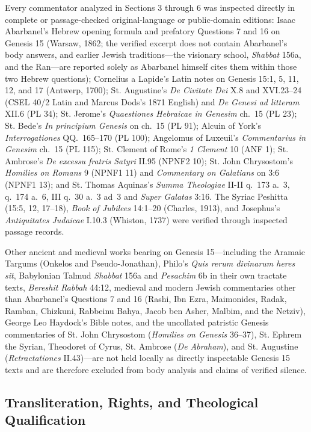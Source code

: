 Every commentator analyzed in Sections 3 through 6 was inspected directly in complete or passage-checked original-language or public-domain editions: Isaac Abarbanel's Hebrew opening formula and prefatory Questions 7 and 16 on Genesis 15 (Warsaw, 1862; the verified excerpt does not contain Abarbanel's body answers, and earlier Jewish traditions---the visionary school, \emph{Shabbat} 156a, and the Ran---are reported solely as Abarbanel himself cites them within those two Hebrew questions); Cornelius a Lapide's Latin notes on Genesis 15:1, 5, 11, 12, and 17 (Antwerp, 1700); St. Augustine's \emph{De Civitate Dei} X.8 and XVI.23--24 (CSEL 40/2 Latin and Marcus Dods's 1871 English) and \emph{De Genesi ad litteram} XII.6 (PL 34); St. Jerome's \emph{Quaestiones Hebraicae in Genesim} ch.~15 (PL 23); St. Bede's \emph{In principium Genesis} on ch.~15 (PL 91); Alcuin of York's \emph{Interrogationes} QQ.~165--170 (PL 100); Angelomus of Luxeuil's \emph{Commentarius in Genesim} ch.~15 (PL 115); St. Clement of Rome's \emph{1 Clement} 10 (ANF 1); St. Ambrose's \emph{De excessu fratris Satyri} II.95 (NPNF2 10); St. John Chrysostom's \emph{Homilies on Romans} 9 (NPNF1 11) and \emph{Commentary on Galatians} on 3:6 (NPNF1 13); and St. Thomas Aquinas's \emph{Summa Theologiae} II-II q.~173 a.~3, q.~174 a.~6, III q.~30 a.~3 ad~3 and \emph{Super Galatas} 3:16. The Syriac Peshitta (15:5, 12, 17--18), \emph{Book of Jubilees} 14:1--20 (Charles, 1913), and Josephus's \emph{Antiquitates Judaicae} I.10.3 (Whiston, 1737) were verified through inspected passage records.

Other ancient and medieval works bearing on Genesis 15---including the Aramaic Targums (Onkelos and Pseudo-Jonathan), Philo's \emph{Quis rerum divinarum heres sit}, Babylonian Talmud \emph{Shabbat} 156a and \emph{Pesachim} 6b in their own tractate texts, \emph{Bereshit Rabbah} 44:12, medieval and modern Jewish commentaries other than Abarbanel's Questions 7 and 16 (Rashi, Ibn Ezra, Maimonides, Radak, Ramban, Chizkuni, Rabbeinu Bahya, Jacob ben Asher, Malbim, and the Netziv), George Leo Haydock's Bible notes, and the uncollated patristic Genesis commentaries of St. John Chrysostom (\emph{Homilies on Genesis} 36--37), St. Ephrem the Syrian, Theodoret of Cyrus, St. Ambrose (\emph{De Abraham}), and St. Augustine (\emph{Retractationes} II.43)---are not held locally as directly inspectable Genesis 15 texts and are therefore excluded from body analysis and claims of verified silence.

\subsection*{Transliteration, Rights, and Theological Qualification}

